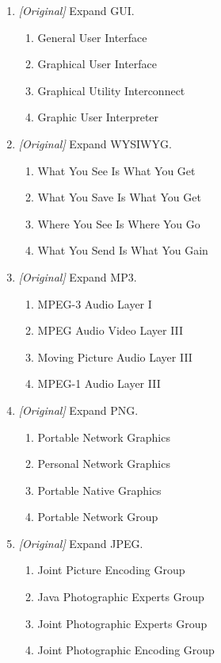\begin{enumerate}[label=\textbf{Q\arabic*.}, leftmargin=*]
\item \textit{[Original]} Expand GUI.
  \begin{enumerate}[label=\Alph*.]
    \item General User Interface
    \item Graphical User Interface
    \item Graphical Utility Interconnect
    \item Graphic User Interpreter
  \end{enumerate}
\item \textit{[Original]} Expand WYSIWYG.
  \begin{enumerate}[label=\Alph*.]
    \item What You See Is What You Get
    \item What You Save Is What You Get
    \item Where You See Is Where You Go
    \item What You Send Is What You Gain
  \end{enumerate}
\item \textit{[Original]} Expand MP3.
  \begin{enumerate}[label=\Alph*.]
    \item MPEG-3 Audio Layer I
    \item MPEG Audio Video Layer III
    \item Moving Picture Audio Layer III
    \item MPEG-1 Audio Layer III
  \end{enumerate}
\item \textit{[Original]} Expand PNG.
  \begin{enumerate}[label=\Alph*.]
    \item Portable Network Graphics
    \item Personal Network Graphics
    \item Portable Native Graphics
    \item Portable Network Group
  \end{enumerate}
\item \textit{[Original]} Expand JPEG.
  \begin{enumerate}[label=\Alph*.]
    \item Joint Picture Encoding Group
    \item Java Photographic Experts Group
    \item Joint Photographic Experts Group
    \item Joint Photographic Encoding Group

\end{enumerate}
\end{enumerate}
